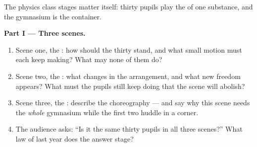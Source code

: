 \begin{problem}\label{pb:g7:states-of-matter:1}
The physics class stages matter itself: thirty pupils play the
 of one substance, and the gymnasium is the container.

\medskip\noindent\textbf{Part I --- Three scenes.}
\begin{enumerate}
  \item Scene one, the : how should the thirty stand, and
        what small motion must each keep making? What may none of
        them do?
  \item Scene two, the : what changes in the arrangement,
        and what new freedom appears? What must the pupils still
        keep doing that the  scene will abolish?
  \item Scene three, the : describe the choreography --- and
        say why this scene needs the \emph{whole} gymnasium while
        the first two huddle in a corner.
  \item The audience asks: ``Is it the same thirty pupils in all
        three scenes?'' What law of last year does the answer
        stage?
\end{enumerate}


\end{problem}
